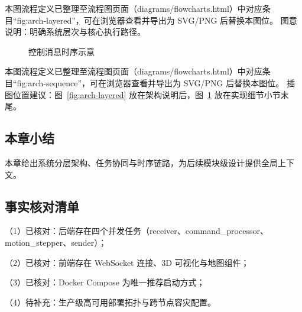 \noindent 本图流程定义已整理至流程图页面（diagrams/flowcharts.html）中对应条目“fig:arch-layered”，可在浏览器查看并导出为 SVG/PNG 后替换本图位。
\noindent 图意说明：明确系统层次与核心执行路径。

\begin{figure}[htbp]
\centering
{}
\caption{控制消息时序示意}
\label{fig:arch-sequence}
\end{figure}

\noindent 本图流程定义已整理至流程图页面（diagrams/flowcharts.html）中对应条目“fig:arch-sequence”，可在浏览器查看并导出为 SVG/PNG 后替换本图位。
\noindent 插图位置建议：图~\ref{fig:arch-layered} 放在架构说明后，图~\ref{fig:arch-sequence} 放在实现细节小节末尾。

\subsection{本章小结}
本章给出系统分层架构、任务协同与时序链路，为后续模块级设计提供全局上下文。

\subsection{事实核对清单}
（1）已核对：后端存在四个并发任务（receiver、command\_processor、motion\_stepper、sender）；

（2）已核对：前端存在 WebSocket 连接、3D 可视化与地图组件；

（3）已核对：Docker Compose 为唯一推荐启动方式；

（4）待补充：生产级高可用部署拓扑与跨节点容灾配置。
